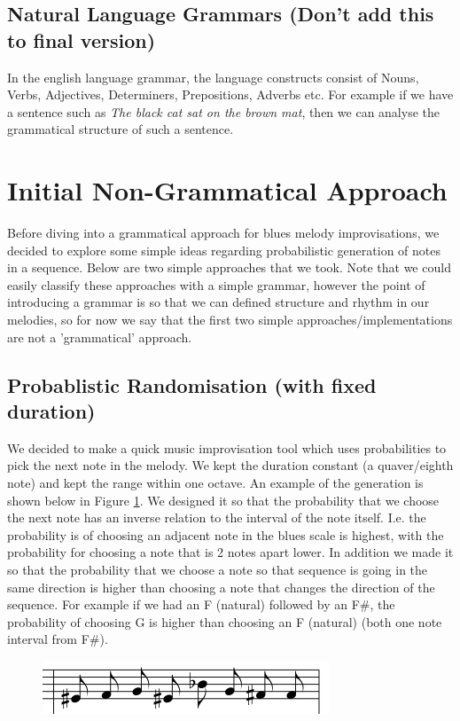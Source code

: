 \documentclass[pdftex,12pt,a4paper]{report}
\begin{document}
\subsection{Natural Language Grammars (Don't add this to final version)}
In the english language grammar, the language constructs consist of Nouns, Verbs, Adjectives, Determiners, Prepositions, Adverbs etc. For example if we have a sentence such as \textit{The black cat sat on the brown mat}, then we can analyse the grammatical structure of such a sentence.


\section{Initial Non-Grammatical Approach}

Before diving into a grammatical approach for blues melody improvisations, we decided to explore some simple ideas regarding probabilistic generation of notes in a sequence. Below are two simple approaches that we took. Note that we could easily classify these approaches with a simple grammar, however the point of introducing a grammar is so that we can defined structure and rhythm in our melodies, so for now we say that the first two simple approaches/implementations are not a 'grammatical' approach.

\subsection{Probablistic Randomisation (with fixed duration)}
We decided to make a quick music improvisation tool which uses probabilities to pick the next note in the melody. We kept the duration constant (a quaver/eighth note) and kept the range within one octave. An example of the generation is shown below in Figure \ref{fig:randomgeneration}. We designed it so that the probability that we choose the next note has an inverse relation to the interval of the note itself. I.e. the probability is of choosing an adjacent note in the blues scale is highest, with the probability for choosing a note that is 2 notes apart lower. In addition we made it so that the probability that we choose a note so that sequence is going in the same direction is higher than choosing a note that changes the direction of the sequence. For example if we had an F (natural) followed by an F\#, the probability of choosing G is higher than choosing an F (natural) (both one note interval from F\#).

\begin{figure}[here]
  \centering
  \includegraphics[scale=0.7]{figure/randomgeneration.png}
  \label{fig:randomgeneration}
\end{figure}
\end{document}
